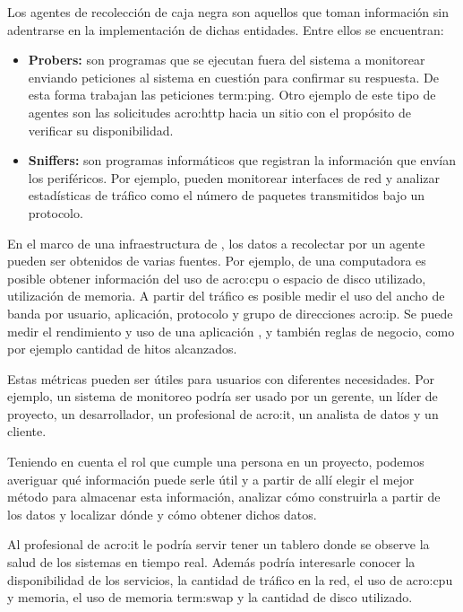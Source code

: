 Los agentes de recolección de caja negra son aquellos que toman información sin
adentrarse en la implementación de dichas entidades. Entre ellos se encuentran:

\begin{itemize}
  \item \textbf{Probers:} son programas que se ejecutan fuera del sistema a
    monitorear enviando peticiones al sistema en cuestión para confirmar su
    respuesta. De esta forma trabajan las peticiones \gls{term:ping}. Otro
    ejemplo de este tipo de agentes son las solicitudes \gls{acro:http} hacia
    un sitio  con el propósito de verificar su disponibilidad.

  \item \textbf{Sniffers:} son programas informáticos que registran la
    información que envían los periféricos. Por ejemplo, pueden monitorear
    interfaces de red y analizar estadísticas de tráfico como el número de
    paquetes transmitidos bajo un protocolo.
    \cite[p.~15-16]{monitoreo:efective_monitoring_and_alerting}
\end{itemize}

En el marco de una infraestructura de , los datos a recolectar por un
agente pueden ser obtenidos de varias fuentes. Por ejemplo, de una computadora
es posible obtener información del uso de \gls{acro:cpu} o espacio de disco utilizado,
utilización de memoria. A partir del tráfico  es posible medir el
uso del ancho de banda por usuario, aplicación, protocolo y grupo de
direcciones \gls{acro:ip}. Se puede medir el rendimiento y uso de una
aplicación , y también reglas de negocio, como por ejemplo
cantidad de hitos alcanzados.

Estas métricas pueden ser útiles para usuarios con diferentes necesidades. Por
ejemplo, un sistema de monitoreo podría ser usado por un gerente, un líder de
proyecto, un desarrollador, un profesional de \gls{acro:it}, un analista de
datos y un cliente.

Teniendo en cuenta el rol que cumple una persona en un proyecto, podemos
averiguar qué información puede serle útil y a partir de allí elegir el mejor
método para almacenar esta información, analizar cómo construirla a partir de
los datos y localizar dónde y cómo obtener dichos datos.

Al profesional de \gls{acro:it} le podría servir tener un tablero donde se
observe la salud de los sistemas en tiempo real. Además podría interesarle
conocer la disponibilidad de los servicios, la cantidad de tráfico en la red,
el uso de \gls{acro:cpu} y memoria, el uso de memoria \gls{term:swap} y la
cantidad de disco utilizado.

